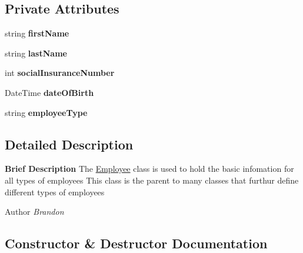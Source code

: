 \subsection*{Private Attributes}
\begin{DoxyCompactItemize}
\item 
\hypertarget{class_all_employees_1_1_employee_a04c4c16015aa2d889fd2042ce4b8a1d7}{}string {\bfseries first\+Name}\label{class_all_employees_1_1_employee_a04c4c16015aa2d889fd2042ce4b8a1d7}

\item 
\hypertarget{class_all_employees_1_1_employee_ac3721b61919ca9cd29a400620562170e}{}string {\bfseries last\+Name}\label{class_all_employees_1_1_employee_ac3721b61919ca9cd29a400620562170e}

\item 
\hypertarget{class_all_employees_1_1_employee_a31f55bb91fe0871c5d9a3cb77f44a4df}{}int {\bfseries social\+Insurance\+Number}\label{class_all_employees_1_1_employee_a31f55bb91fe0871c5d9a3cb77f44a4df}

\item 
\hypertarget{class_all_employees_1_1_employee_a00f33298e4408f0a0402a34c9aa2067a}{}Date\+Time {\bfseries date\+Of\+Birth}\label{class_all_employees_1_1_employee_a00f33298e4408f0a0402a34c9aa2067a}

\item 
\hypertarget{class_all_employees_1_1_employee_a246198254823dc5a10197029b17479b4}{}string {\bfseries employee\+Type}\label{class_all_employees_1_1_employee_a246198254823dc5a10197029b17479b4}

\end{DoxyCompactItemize}


\subsection{Detailed Description}
{\bfseries Brief Description} The \hyperlink{class_all_employees_1_1_employee}{Employee} class is used to hold the basic infomation for all types of employees This class is the parent to many classes that furthur define different types of employees 

\begin{DoxyAuthor}{Author}
{\itshape Brandon} 
\end{DoxyAuthor}


\subsection{Constructor \& Destructor Documentation}
\hypertarget{class_all_employees_1_1_employee_ac3aa5a59bf1ddba2c45cc933bf897e04}{}
